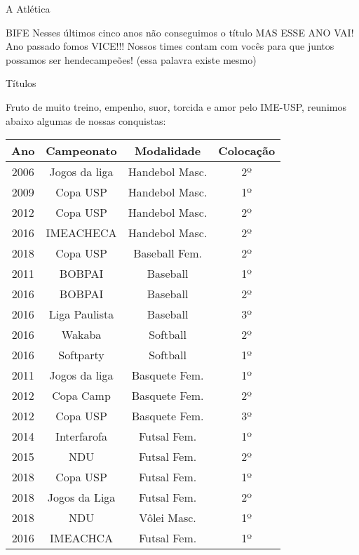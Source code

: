 \begin{secao}{A Atlética}
\begin{subsecao}{BIFE}
Nesses últimos cinco anos não conseguimos o título MAS ESSE ANO VAI! Ano passado
fomos VICE!!! Nossos times contam com vocês para que juntos possamos ser
hendecampeões! (essa palavra existe mesmo)

\end{subsecao}
\begin{subsecao}{Títulos}

Fruto de muito treino, empenho, suor, torcida e amor pelo IME-USP, reunimos
abaixo algumas de nossas conquistas:

\begin{center}
  \begin{tabular}{c|c|c|c}
    Ano & Campeonato & Modalidade & Colocação\\
    \hline
    2006 & Jogos da liga  & Handebol Masc.  & 2º\\
    2009 & Copa USP       & Handebol Masc.  & 1º\\
    2012 & Copa USP       & Handebol Masc.  & 2º\\
    2016 & IMEACHECA      & Handebol Masc.  & 2º\\
    2018 & Copa USP       & Baseball Fem.   & 2º\\
    2011 & BOBPAI         & Baseball        & 1º\\
    2016 & BOBPAI         & Baseball        & 2º\\
    2016 & Liga Paulista  & Baseball        & 3º\\
    2016 & Wakaba         & Softball        & 2º\\
    2016 & Softparty      & Softball        & 1º\\
    2011 & Jogos da liga  & Basquete Fem.   & 1º\\
    2012 & Copa Camp      & Basquete Fem.   & 2º\\
    2012 & Copa USP       & Basquete Fem.   & 3º\\
    2014 & Interfarofa    & Futsal Fem.     & 1º\\
    2015 & NDU            & Futsal Fem.     & 2º\\
    2018 & Copa USP       & Futsal Fem.     & 1º\\
    2018 & Jogos da Liga  & Futsal Fem.     & 2º\\
    2018 & NDU            & Vôlei Masc.     & 1º\\
    2016 & IMEACHCA       & Futsal Fem.     & 1º\\

\end{tabular}
\end{center}
\end{subsecao}
\end{secao}
